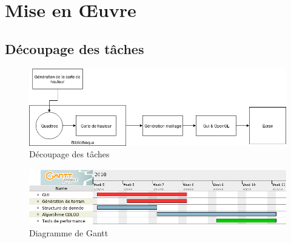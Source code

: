 \documentclass[12pt]{report}
\begin{document}
\newpage

\chapter*{Mise en Œuvre}
\setcounter{chapter}{4}




\section{Découpage des tâches}

\begin{center}
\begin{figure}[!h]
  \includegraphics[scale=0.5]{img/DecoupageTache.png}
  \caption{Découpage des tâches}
  \label{fig:tache}
\end{figure}
\end{center}

\begin{center}
\begin{figure}[!h]
  \includegraphics[scale=0.5]{img/gantt.png}
  \caption{Diagramme de Gantt}
  \label{fig:gantt}
\end{figure}
\end{center}

{}

\end{document}
